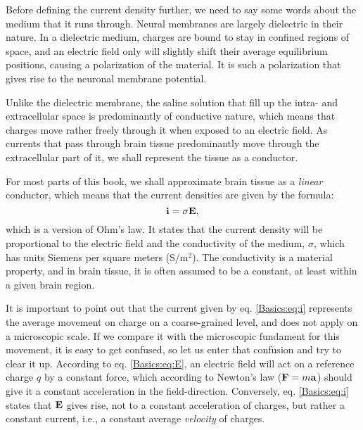 Before defining the current density further, we need to say some words about the medium that it runs through. Neural membranes are largely dielectric in their nature. In a dielectric medium, charges are bound to stay in confined regions of space, and an electric field only will slightly shift their average equilibrium positions, causing a polarization of the material. It is such a polarization that gives rise to the neuronal membrane potential. 

Unlike the dielectric membrane, the saline solution that fill up the intra- and extracellular space is predominantly of conductive nature, which means that charges move rather freely through it when exposed to an electric field. As currents that pass through brain tissue predominantly move through the extracellular part of it, we shall represent the tissue as a conductor. 

For most parts of this book, we shall approximate brain tissue as a \textit{linear} conductor, which means that the current densities are given by the formula:
\begin{equation}
{\bf i} = \sigma {\bf E}, 
\label{Basics:eq:i}
\end{equation}
which is a version of Ohm's law. It states that the current density will be proportional to the electric field and the conductivity of the medium, $\sigma$, which has units Siemens per square meters (S/m$^2$). The conductivity is a material property, and in brain tissue, it is often assumed to be a constant, at least within a given brain region. 

It is important to point out that the current given by eq. \ref{Basics:eq:i} represents the average movement on charge on a coarse-grained level, and does not apply on a microscopic scale. If we compare it with the microscopic fundament for this movement, it is easy to get confused, so let us enter that confusion and try to clear it up. According to eq. \ref{Basics:eq:E}, an electric field will act on a reference charge $q$ by a constant force, which according to Newton's law (${\bf F} = m{\bf a}$) should give it a constant acceleration in the field-direction. Conversely, eq. \ref{Basics:eq:i} states that ${\bf E}$ gives rise, not to a constant acceleration of charges, but rather a constant current, i.e., a constant average \textit{velocity} of charges. 

